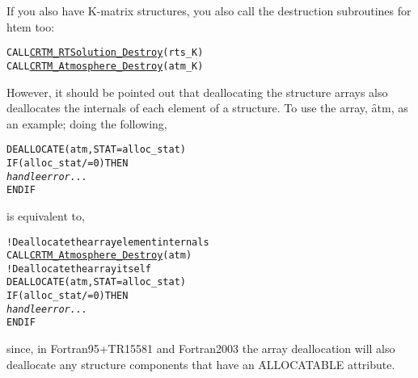 If you also have K-matrix structures, you also call the destruction subroutines for htem too:

\begin{alltt}
  CALL \hyperref[sec:CRTM_RTSolution_Destroy_interface]{CRTM_RTSolution_Destroy}(rts_K)
  CALL \hyperref[sec:CRTM_Atmosphere_Destroy_interface]{CRTM_Atmosphere_Destroy}(atm_K)\end{alltt}

However, it should be pointed out that deallocating the structure arrays also deallocates the internals of each element of a structure. To use the \hyperref[sec:atmosphere_structure]{\Atmosphere} array, \f{atm}, as an example; doing the following,

\begin{alltt}
  DEALLOCATE( atm, STAT = alloc_stat )
  IF ( alloc_stat /= 0 ) THEN
    \textrm{\textit{handle error...}}
  END IF\end{alltt}
  
is equivalent to,

\begin{alltt}
  ! Deallocate the array element internals
  CALL \hyperref[sec:CRTM_Atmosphere_Destroy_interface]{CRTM_Atmosphere_Destroy}(atm)
  ! Deallocate the array itself
  DEALLOCATE( atm, STAT = alloc_stat )
  IF ( alloc_stat /= 0 ) THEN
    \textrm{\textit{handle error...}}
  END IF\end{alltt}

since, in Fortran95+TR15581 and Fortran2003 the array deallocation will also deallocate any structure components that have an \f{ALLOCATABLE} attribute.
